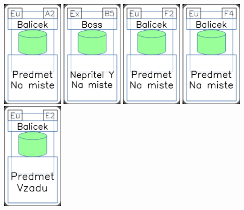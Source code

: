 \documentclass[a4paper]{article}
\begin{document}
	\includegraphics[width=3.0cm]{img-4_31}
	\includegraphics[width=3.0cm]{img-4_9}
	\includegraphics[width=3.0cm]{img-4_26}
	\includegraphics[width=3.0cm]{img-4_28}
	\includegraphics[width=3.0cm]{img-4_21}
\end{document}
